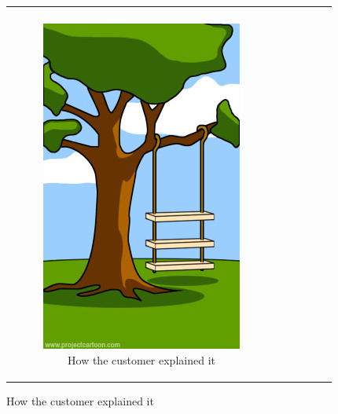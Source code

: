 \begin{figure}[h]
\begin{center}
\begin{tabular}{|c|c|c|c|c|c|}\hline
&&&&&\\
\begin{subfigure}[t]{0.15\textwidth}\centering\includegraphics[width=0.9\columnwidth]{images/howexplained}
\caption*{\tiny \centering How the customer explained it}\label{fig:howexplained}\end{subfigure}&

\end{tabular}
\end{center}
\end{figure}
